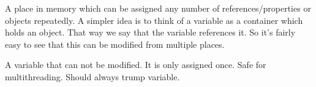 \documentclass[../../../book.tex]{subfiles}
\begin{document}
A place in memory which can be assigned any number of references/properties or objects repeatedly. A simpler idea is to think of a variable as a container which holds an object. That way we say that the variable references it. So it's fairly easy to see that this can be modified from multiple places.

A variable that can not be modified. It is only assigned once. Safe for multithreading. Should always trump variable.
\end{document}
